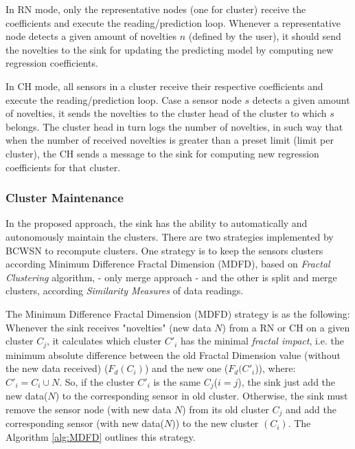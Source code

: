 \documentclass[conference]{IEEEtran}
\begin{document}
In RN mode, only the representative nodes (one for cluster)  receive the
coefficients and execute the reading/prediction loop. Whenever a representative
node detects a given amount of novelties $n$ (defined by the user), it should
send the novelties to the sink for updating the predicting model by computing
new regression coefficients.

In CH mode, all sensors in a cluster receive their respective coefficients and
execute the reading/prediction loop. Case a sensor node $s$ detects a given
amount of novelties, it sends the novelties to the cluster head of the cluster
to which $s$ belongs. The cluster head in turn logs the number of novelties, in
such way that when the number of received novelties is greater than  a preset
limit (limit per cluster), the CH sends a message to the sink for computing new
regression coefficients for that cluster.


\subsubsection{Cluster Maintenance}

In the proposed approach, the sink has the ability to automatically and
autonomously maintain the clusters. There are two strategies implemented by
BCWSN to recompute clusters. One strategy is to keep the sensors clusters
according Minimum Difference Fractal Dimension (MDFD), based on \textit{Fractal
Clustering} algorithm, - only merge approach - and the other is split and merge
clusters, according \textit{Similarity Measures} of data readings.

The Minimum Difference Fractal Dimension (MDFD) strategy is as the following:
Whenever the sink receives "novelties" (new data $N$) from a RN or CH on a
given cluster $C_j$, it calculates which cluster $C'_i$ has the minimal
\textit{fractal impact}, i.e. the minimum absolute difference between the old Fractal
Dimension value (without the new data received) ($F_{d}(C_i)$) and the new one
($F_{d}(C'_i$)), where: $C'_i = C_i \cup N$.
So, if the cluster $C'_i$ is the same $C_j$($i=j$), the sink just add the new
data($N$) to the corresponding sensor in old cluster. Otherwise, the sink must
remove the sensor node (with new data $N$) from its old cluster $C_j$ and add
the corresponding sensor (with new data($N$)) to the new cluster $(C_i)$.
The Algorithm \ref{alg:MDFD} outlines this strategy.

\end{document}
